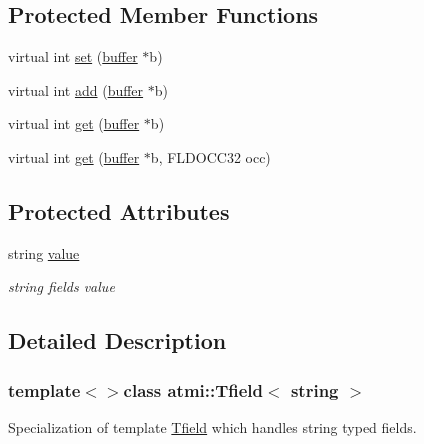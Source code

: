 \subsection*{Protected Member Functions}
\begin{DoxyCompactItemize}
\item 
virtual int \hyperlink{classatmi_1_1_tfield_3_01string_01_4_aac572b9f5c296cdb4589ed409f4084ed}{set} (\hyperlink{classatmi_1_1buffer}{buffer} $\ast$b)
\item 
virtual int \hyperlink{classatmi_1_1_tfield_3_01string_01_4_a20be721257ccba7903a5fe4ed3dc672d}{add} (\hyperlink{classatmi_1_1buffer}{buffer} $\ast$b)
\item 
virtual int \hyperlink{classatmi_1_1_tfield_3_01string_01_4_a3001b8eb567de52e2193e54373721afe}{get} (\hyperlink{classatmi_1_1buffer}{buffer} $\ast$b)
\item 
virtual int \hyperlink{classatmi_1_1_tfield_3_01string_01_4_ad3936cbfcb487109f6e9cd2f32fd71c5}{get} (\hyperlink{classatmi_1_1buffer}{buffer} $\ast$b, F\+L\+D\+O\+C\+C32 occ)
\end{DoxyCompactItemize}
\subsection*{Protected Attributes}
\begin{DoxyCompactItemize}
\item 
\hypertarget{classatmi_1_1_tfield_3_01string_01_4_afba2608339682e6d6f10dd8bb9875cc6}{}string \hyperlink{classatmi_1_1_tfield_3_01string_01_4_afba2608339682e6d6f10dd8bb9875cc6}{value}\label{classatmi_1_1_tfield_3_01string_01_4_afba2608339682e6d6f10dd8bb9875cc6}

\begin{DoxyCompactList}\small\item\em string field\textquotesingle{}s value \end{DoxyCompactList}\end{DoxyCompactItemize}


\subsection{Detailed Description}
\subsubsection*{template$<$$>$class atmi\+::\+Tfield$<$ string $>$}

Specialization of template \hyperlink{classatmi_1_1_tfield}{Tfield} which handles string typed fields.

